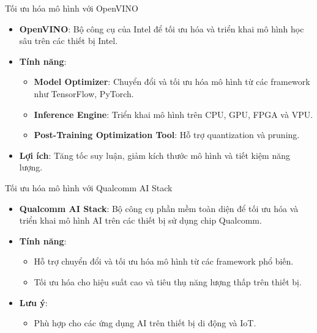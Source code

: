 \documentclass{beamer}
\begin{document}
\begin{frame}{Tối ưu hóa mô hình với OpenVINO}
    \begin{itemize}
        \item \textbf{OpenVINO}: Bộ công cụ của Intel để tối ưu hóa và triển khai mô hình học sâu trên các thiết bị Intel.
        \item \textbf{Tính năng}:
        \begin{itemize}
            \item \textbf{Model Optimizer}: Chuyển đổi và tối ưu hóa mô hình từ các framework như TensorFlow, PyTorch.
            \item \textbf{Inference Engine}: Triển khai mô hình trên CPU, GPU, FPGA và VPU.
            \item \textbf{Post-Training Optimization Tool}: Hỗ trợ quantization và pruning.
        \end{itemize}
        \item \textbf{Lợi ích}: Tăng tốc suy luận, giảm kích thước mô hình và tiết kiệm năng lượng.
    \end{itemize}
\end{frame}

\begin{frame}{Tối ưu hóa mô hình với Qualcomm AI Stack}
    \begin{itemize}
        \item \textbf{Qualcomm AI Stack}: Bộ công cụ phần mềm toàn diện để tối ưu hóa và triển khai mô hình AI trên các thiết bị sử dụng chip Qualcomm.
        \item \textbf{Tính năng}:
        \begin{itemize}
            \item Hỗ trợ chuyển đổi và tối ưu hóa mô hình từ các framework phổ biến.
            \item Tối ưu hóa cho hiệu suất cao và tiêu thụ năng lượng thấp trên thiết bị.
        \end{itemize}
        \item \textbf{Lưu ý}:
        \begin{itemize}
            \item Phù hợp cho các ứng dụng AI trên thiết bị di động và IoT.
        \end{itemize}
    \end{itemize}
\end{frame}
\end{document}
